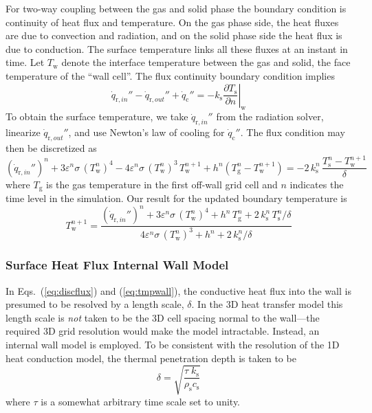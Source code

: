 For two-way coupling between the gas and solid phase the boundary condition is continuity of heat flux and temperature.  On the gas phase side, the heat fluxes are due to convection and radiation, and on the solid phase side the heat flux is due to conduction.  The surface temperature links all these fluxes at an instant in time.  Let $T_{\mathrm{w}}$ denote the interface temperature between the gas and solid, the face temperature of the ``wall cell''.  The flux continuity boundary condition implies
\begin{equation}
\label{eq:fluxcontinuity}
\dot{q}_{{\mathrm{r}}, in}'' - \dot{q}_{{\mathrm{r}}, out}'' + \dot{q}_{\mathrm{c}}'' = -k_{\mathrm{s}} \left. \frac{\partial T_{\mathrm{s}}}{\partial n} \right|_{\mathrm{w}}
\end{equation}
To obtain the surface temperature, we take $\dot{q}_{{\mathrm{r}}, in}''$ from the radiation solver, linearize $\dot{q}_{{\mathrm{r}}, out}''$, and use Newton's law of cooling for $\dot{q}_{\mathrm{c}}''$. The flux condition may then be discretized as
\begin{equation}
\label{eq:discflux}
( \dot{q}_{{\mathrm{r}}, in}'' )^n + 3 \varepsilon^n \sigma \, (T_{\mathrm{w}}^n)^4 - 4 \varepsilon^n \sigma \, (T_{\mathrm{w}}^n)^3 \, T_{\mathrm{w}}^{n+1} + h^n (T_{\mathrm{g}}^n - T_{\mathrm{w}}^{n+1}) = -2 \, k_{\mathrm{s}}^n \, \frac{T_{\mathrm{s}}^n - T_{\mathrm{w}}^{n+1}}{\delta}
\end{equation}
where $T_{\mathrm{g}}$ is the gas temperature in the first off-wall grid cell and $n$ indicates the time level in the simulation.  Our result for the updated boundary temperature is
\begin{equation}
\label{eq:tmpwall}
T_{\mathrm{w}}^{n+1} = \frac{ ( \dot{q}_{{\mathrm{r}}, in}'' )^n + 3 \varepsilon^n \sigma \, (T_{\mathrm{w}}^n)^4 + h^n \, T_{\mathrm{g}}^n + 2 \, k_{\mathrm{s}}^n \, T_{\mathrm{s}}^n/\delta }{ 4 \varepsilon^n \sigma \, (T_{\mathrm{w}}^n)^3 + h^n + 2 \, k_{\mathrm{s}}^n / \delta}
\end{equation}

\subsubsection*{Surface Heat Flux Internal Wall Model}

In Eqs.~(\ref{eq:discflux}) and (\ref{eq:tmpwall}), the conductive heat flux into the wall is presumed to be resolved by a length scale, $\delta$.  In the 3D heat transfer model this length scale is \emph{not} taken to be the 3D cell spacing normal to the wall---the required 3D grid resolution would make the model intractable.  Instead, an internal wall model is employed.  To be consistent with the resolution of the 1D heat conduction model, the thermal penetration depth is taken to be
\begin{equation}
\label{eq:pendepth}
\delta = \sqrt{\frac{ \tau \; k_{\mathrm{s}}}{\rho_{\mathrm{s}} c_{\mathrm{s}}}}
\end{equation}
where $\tau$ is a somewhat arbitrary time scale set to unity.

